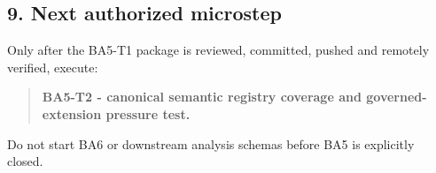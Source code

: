 \documentclass[
  10pt,
  a4paper,
]{article}
\begin{document}
\subsection{9. Next authorized
microstep}\label{next-authorized-microstep}

Only after the BA5-T1 package is reviewed, committed, pushed and
remotely verified, execute:

\begin{quote}
\textbf{BA5-T2 - canonical semantic registry coverage and
governed-extension pressure test.}
\end{quote}

Do not start BA6 or downstream analysis schemas before BA5 is explicitly
closed.
\end{document}
